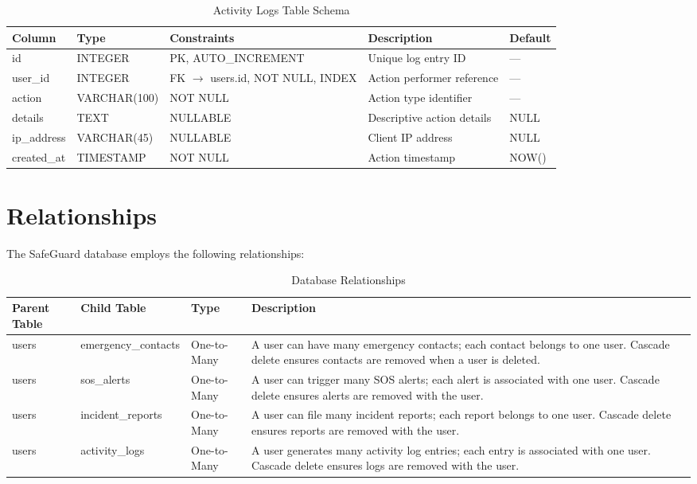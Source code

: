 \begin{table}[H]
  \centering
  \caption{Activity Logs Table Schema}
  \label{tab:schema-activity}
  \begin{tabularx}{\textwidth}{@{}l l l X l@{}}
    \toprule
    \textbf{Column} & \textbf{Type} & \textbf{Constraints} & \textbf{Description} & \textbf{Default} \\
    \midrule
    id & INTEGER & PK, AUTO\_INCREMENT & Unique log entry ID & --- \\
    user\_id & INTEGER & FK $\to$ users.id, NOT NULL, INDEX & Action performer reference & --- \\
    action & VARCHAR(100) & NOT NULL & Action type identifier & --- \\
    details & TEXT & NULLABLE & Descriptive action details & NULL \\
    ip\_address & VARCHAR(45) & NULLABLE & Client IP address & NULL \\
    created\_at & TIMESTAMP & NOT NULL & Action timestamp & NOW() \\
    \bottomrule
  \end{tabularx}
\end{table}

\section{Relationships}

The SafeGuard database employs the following relationships:

\begin{table}[H]
  \centering
  \caption{Database Relationships}
  \label{tab:relationships}
  \begin{tabularx}{\textwidth}{@{}l l l X@{}}
    \toprule
    \textbf{Parent Table} & \textbf{Child Table} & \textbf{Type} & \textbf{Description} \\
    \midrule
    users & emergency\_contacts & One-to-Many & A user can have many emergency contacts; each contact belongs to one user. Cascade delete ensures contacts are removed when a user is deleted. \\
    users & sos\_alerts & One-to-Many & A user can trigger many SOS alerts; each alert is associated with one user. Cascade delete ensures alerts are removed with the user. \\
    users & incident\_reports & One-to-Many & A user can file many incident reports; each report belongs to one user. Cascade delete ensures reports are removed with the user. \\
    users & activity\_logs & One-to-Many & A user generates many activity log entries; each entry is associated with one user. Cascade delete ensures logs are removed with the user. \\
    \bottomrule
  \end{tabularx}
\end{table}

